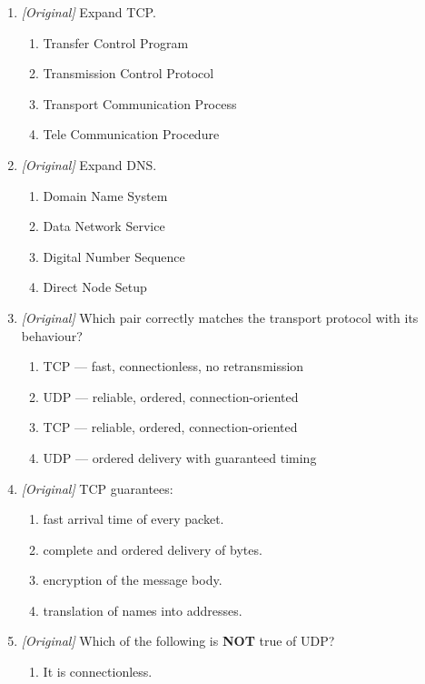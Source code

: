 \begin{enumerate}[label=\textbf{Q\arabic*.}, leftmargin=*]
\item \textit{[Original]} Expand TCP.
  \begin{enumerate}[label=\Alph*.]
    \item Transfer Control Program
    \item Transmission Control Protocol
    \item Transport Communication Process
    \item Tele Communication Procedure
  \end{enumerate}
\item \textit{[Original]} Expand DNS.
  \begin{enumerate}[label=\Alph*.]
    \item Domain Name System
    \item Data Network Service
    \item Digital Number Sequence
    \item Direct Node Setup
  \end{enumerate}
\item \textit{[Original]} Which pair correctly matches the transport protocol
  with its behaviour?
  \begin{enumerate}[label=\Alph*.]
    \item TCP --- fast, connectionless, no retransmission
    \item UDP --- reliable, ordered, connection-oriented
    \item TCP --- reliable, ordered, connection-oriented
    \item UDP --- ordered delivery with guaranteed timing
  \end{enumerate}
\item \textit{[Original]} TCP guarantees:
  \begin{enumerate}[label=\Alph*.]
    \item fast arrival time of every packet.
    \item complete and ordered delivery of bytes.
    \item encryption of the message body.
    \item translation of names into addresses.
  \end{enumerate}
\item \textit{[Original]} Which of the following is \textbf{NOT} true of UDP?
  \begin{enumerate}[label=\Alph*.]
    \item It is connectionless.

\end{enumerate}
\end{enumerate}
